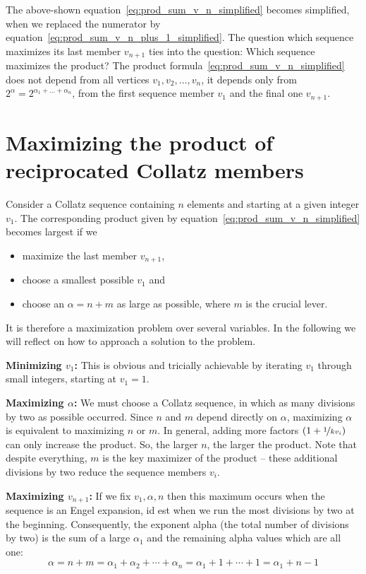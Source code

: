 \documentclass[12pt]{amsart}
\theoremstyle{definition}
\begin{document}
\par\medskip
The above-shown equation~\ref{eq:prod_sum_v_n_simplified} becomes simplified, when we replaced the numerator by equation~\ref{eq:prod_sum_v_n_plus_1_simplified}. The question which sequence maximizes its last member $v_{n+1}$ ties into the question: Which sequence maximizes the product? The product formula~\ref{eq:prod_sum_v_n_simplified} does not depend from all vertices $v_1,v_2,\ldots,v_n$, it depends only from $2^\alpha=2^{\alpha_1+\ldots+\alpha_n}$, from the first sequence member $v_1$ and the final one $v_{n+1}$.

\section{Maximizing the product of reciprocated Collatz members}
Consider a Collatz sequence containing $n$ elements and starting at a given integer $v_1$. The corresponding product given by equation~\ref{eq:prod_sum_v_n_simplified} becomes largest if we
\begin{itemize}
\item maximize the last member $v_{n+1}$,
\item choose a smallest possible $v_1$ and
\item choose an $\alpha=n+m$ as large as possible, where $m$ is the crucial lever.
\end{itemize}

It is therefore a maximization problem over several variables. In the following we will reflect on how to approach a solution to the problem.

\par\medskip\noindent
{\bfseries\boldmath Minimizing $v_1$:} This is obvious and tricially achievable by iterating $v_1$ through small integers, starting at $v_1=1$.

\par\medskip\noindent
{\bfseries\boldmath Maximizing $\alpha$:} We must choose a Collatz sequence, in which as many divisions by two as possible occurred. Since $n$ and $m$ depend directly on $\alpha$, maximizing $\alpha$ is equivalent to maximizing $n$ or $m$. In general, adding more factors $(1+\nicefrac{1}{kv_i})$ can only increase the product. So, the larger $n$, the larger the product. Note that despite everything, $m$ is the key maximizer of the product -- these additional divisions by two reduce the sequence members $v_i$.

\par\medskip\noindent
{\bfseries\boldmath Maximizing $v_{n+1}$:} If we fix $v_1,\alpha,n$ then this maximum occurs when the sequence is an Engel expansion, id est when we run the most divisions by two at the beginning. Consequently, the exponent alpha (the total number of divisions by two) is the sum of a large $\alpha_1$ and the remaining alpha values which are all one:
\[
\alpha=n+m=\alpha_1+\alpha_2+\cdots+\alpha_n=\alpha_1+1+\cdots+1=\alpha_1+n-1
\]
\end{document}
